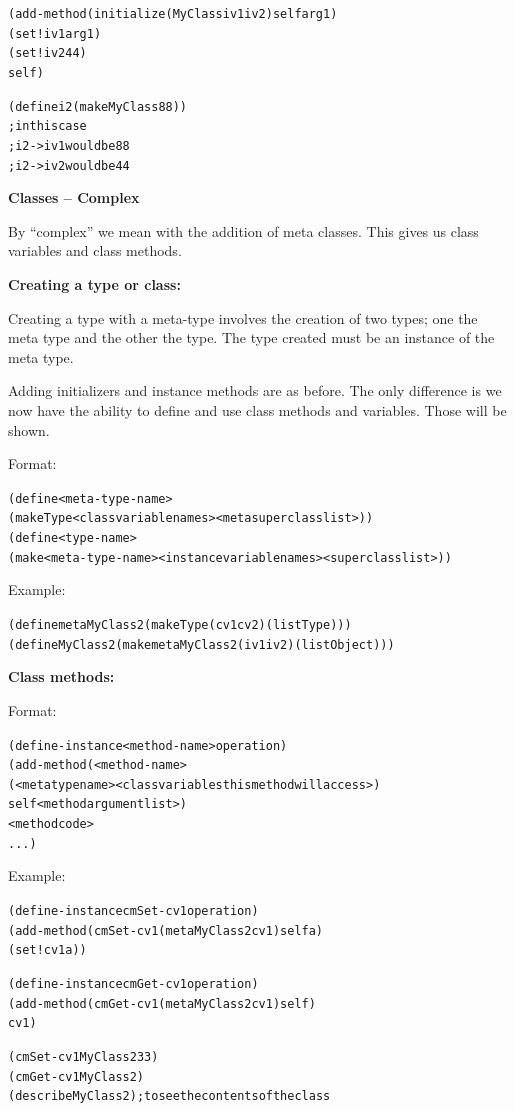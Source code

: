 \documentclass[12pt]{article}
\begin{document}
\begin{alltt}
   (add-method (initialize (MyClass iv1 iv2) self arg1)
        (set! iv1 arg1)
        (set! iv2 44)
        self)

    (define i2 (make MyClass 88))
    ; in this case
    ; i2->iv1 would be 88
    ; i2->iv2 would be 44
\end{alltt}

\newpage

{\large \bfseries Classes -- Complex}

By ``complex'' we mean with the addition of meta classes.  This gives us class variables and class methods.

\textbf{Creating a type or class:}

Creating a type with a meta-type involves the creation of two types; one the meta type and the other the type.
The type created must be an instance of the meta type.

Adding initializers and instance methods are as before.  The only difference is we now have the ability
to define and use class methods and variables.  Those will be shown.

Format:

\begin{alltt}
   (define <meta-type-name>
           (make Type <class variable names> <meta superclass list>))
   (define <type-name>
           (make <meta-type-name>  <instance variable names>  <superclass list>))
\end{alltt}

Example:

\begin{alltt}
    (define metaMyClass2 (make Type \textquotesingle{}(cv1 cv2) (list Type)))
    (define MyClass2 (make metaMyClass2 \textquotesingle{}(iv1 iv2) (list Object)))
\end{alltt}

\textbf{Class methods:}

Format:

\begin{alltt}
   (define-instance <method-name> operation)
   (add-method (<method-name>
                     (<meta type name>  <class variables this method will access>)
                     self  <method argument list>)
               <method code>
               ...)
\end{alltt}

\newpage

Example:

\begin{alltt}
   (define-instance cmSet-cv1 operation)
   (add-method (cmSet-cv1 (metaMyClass2 cv1) self a)
               (set! cv1 a))
  
   (define-instance cmGet-cv1 operation)
   (add-method (cmGet-cv1 (metaMyClass2 cv1) self)
               cv1)

   (cmSet-cv1 MyClass2 33)
   (cmGet-cv1 MyClass2)
   (describe MyClass2)  ; to see the contents of the class
\end{alltt}


\label{lastpage}
\end{document}
